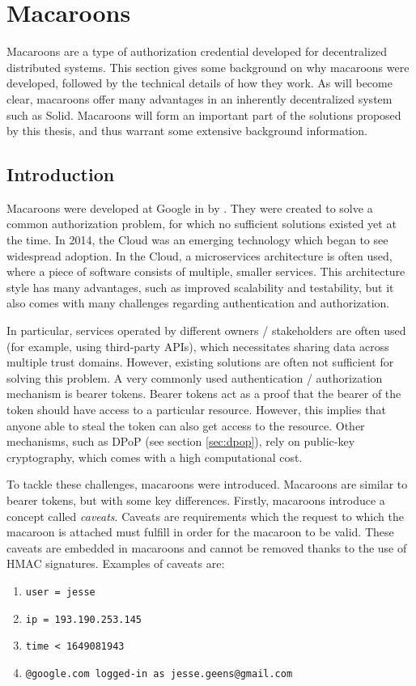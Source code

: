 \newpage

\section{Macaroons}
\label{sec:macaroons}
Macaroons are a type of authorization credential developed for decentralized distributed systems. This section gives some background on why macaroons were developed, followed by the technical details of how they work. As will become clear, macaroons offer many advantages in an inherently decentralized system such as Solid. Macaroons will form an important part of the solutions proposed by this thesis, and thus warrant some extensive background information.

\subsection{Introduction}
\label{sec:macaroons-intro}
Macaroons were developed at Google in \citeyear{macaroons} by \citeauthor{macaroons}. They were created to solve a common authorization problem, for which no sufficient solutions existed yet at the time. In 2014, the Cloud was an emerging technology which began to see widespread adoption. In the Cloud, a microservices architecture is often used, where a piece of software consists of multiple, smaller services. This architecture style has many advantages, such as improved scalability and testability, but it also comes with many challenges regarding authentication and authorization.

In particular, services operated by different owners / stakeholders are often used (for example, using third-party APIs), which necessitates sharing data across multiple trust domains. However, existing solutions are often not sufficient for solving this problem. A very commonly used authentication / authorization mechanism is bearer tokens. Bearer tokens act as a proof that the bearer of the token should have access to a particular resource. However, this implies that anyone able to steal the token can also get access to the resource. Other mechanisms, such as DPoP (see section \ref{sec:dpop}), rely on public-key cryptography, which comes with a high computational cost.

To tackle these challenges, macaroons were introduced. Macaroons are similar to bearer tokens, but with some key differences. Firstly, macaroons introduce a concept called \textit{caveats}. Caveats are requirements which the request to which the macaroon is attached must fulfill in order for the macaroon to be valid. These caveats are embedded in macaroons and cannot be removed thanks to the use of \acrshort{HMAC} signatures. Examples of caveats are:
\begin{enumerate}
    \itemsep0.1em 
    \item \texttt{user = jesse}
    \item \texttt{ip = 193.190.253.145}
    \item \texttt{time < 1649081943}
    \item \texttt{@google.com logged-in as jesse.geens@gmail.com}
\end{enumerate}

